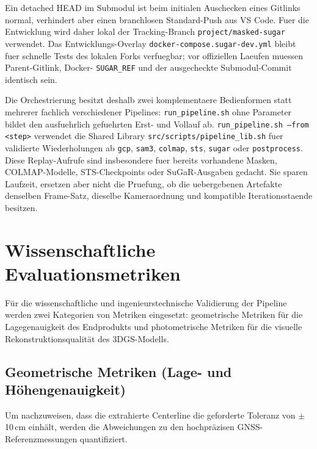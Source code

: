 \documentclass[12pt,a4paper]{article}
\begin{document}
Ein detached HEAD im Submodul ist beim initialen Auschecken eines Gitlinks
normal, verhindert aber einen branchlosen Standard-Push aus VS Code. Fuer die
Entwicklung wird daher lokal der Tracking-Branch
\texttt{project/masked-sugar} verwendet. Das Entwicklungs-Overlay
\texttt{docker-compose.sugar-dev.yml} bleibt fuer schnelle Tests des lokalen
Forks verfuegbar; vor offiziellen Laeufen muessen Parent-Gitlink, Docker-
\texttt{SUGAR\_REF} und der ausgecheckte Submodul-Commit identisch sein.

Die Orchestrierung besitzt deshalb zwei komplementaere Bedienformen statt
mehrerer fachlich verschiedener Pipelines: \texttt{run\_pipeline.sh} ohne
Parameter bildet den ausfuehrlich gefuehrten Erst- und Vollauf ab.
\texttt{run\_pipeline.sh --from <step>} verwendet die Shared Library
\texttt{src/scripts/pipeline\_lib.sh} fuer validierte Wiederholungen ab
\texttt{gcp}, \texttt{sam3}, \texttt{colmap}, \texttt{sts}, \texttt{sugar}
oder \texttt{postprocess}. Diese Replay-Aufrufe sind insbesondere fuer
bereits vorhandene Masken, COLMAP-Modelle, STS-Checkpoints oder SuGaR-Ausgaben
gedacht. Sie sparen Laufzeit, ersetzen aber nicht die Pruefung, ob die
uebergebenen Artefakte denselben Frame-Satz, dieselbe Kameraordnung und
kompatible Iterationsstaende besitzen.

\section{Wissenschaftliche Evaluationsmetriken}
Für die wissenschaftliche und ingenieurstechnische Validierung der Pipeline werden zwei Kategorien von Metriken eingesetzt: geometrische Metriken für die Lagegenauigkeit des Endprodukts und photometrische Metriken für die visuelle Rekonstruktionsqualität des 3DGS-Modells.

\subsection{Geometrische Metriken (Lage- und Höhengenauigkeit)}
Um nachzuweisen, dass die extrahierte Centerline die geforderte Toleranz von $\pm$ 10\,cm einhält, werden die Abweichungen zu den hochpräzisen GNSS-Referenzmessungen quantifiziert.
\end{document}
